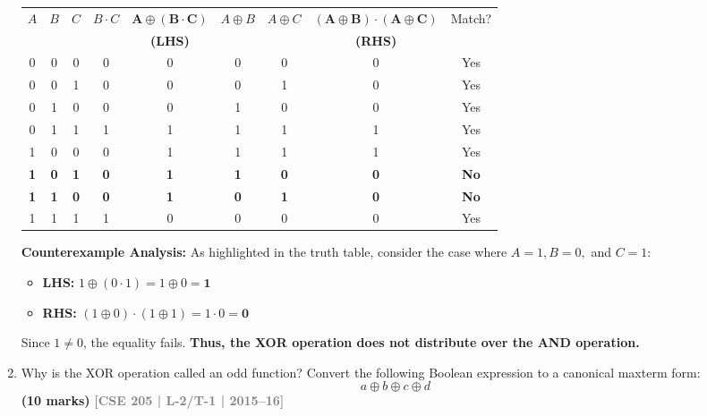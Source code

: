 \documentclass[12pt,a3paper]{article}
\newcommand{\yr}[1]{\hfill\textcolor{gray}{\small\textbf{[#1]}}}
\newcommand{\mk}[1]{\textcolor{orange!70!black}{\small\textbf{(#1 marks)}}}
\begin{document}
\begin{enumerate}
\begin{tcolorbox}[enhanced,breakable,ansbox,colback=cA!4,colframe=cA,boxrule=0.8pt,arc=5pt,title={\textbf{Answer}},fonttitle=\bfseries\color{white},colbacktitle=cA]
\begin{center}
\begin{tabular}{ccccccccc}
    \toprule
    $A$ & $B$ & $C$ & $B \cdot C$ & $\mathbf{A \oplus (B \cdot C)}$ & $A \oplus B$ & $A \oplus C$ & $\mathbf{(A \oplus B) \cdot (A \oplus C)}$ & Match? \\
    & & & & \textbf{(LHS)} & & & \textbf{(RHS)} & \\
    \midrule
    0 & 0 & 0 & 0 & 0 & 0 & 0 & 0 & Yes \\
    0 & 0 & 1 & 0 & 0 & 0 & 1 & 0 & Yes \\
    0 & 1 & 0 & 0 & 0 & 1 & 0 & 0 & Yes \\
    0 & 1 & 1 & 1 & 1 & 1 & 1 & 1 & Yes \\
    1 & 0 & 0 & 0 & 1 & 1 & 1 & 1 & Yes \\
    \textbf{\textcolor{cA}{1}} & \textbf{\textcolor{cA}{0}} & \textbf{\textcolor{cA}{1}} & \textbf{\textcolor{cA}{0}} & \textbf{\textcolor{cA}{1}} & \textbf{\textcolor{cA}{1}} & \textbf{\textcolor{cA}{0}} & \textbf{\textcolor{cA}{0}} & \textbf{\textcolor{cA}{No}} \\
    \textbf{\textcolor{cA}{1}} & \textbf{\textcolor{cA}{1}} & \textbf{\textcolor{cA}{0}} & \textbf{\textcolor{cA}{0}} & \textbf{\textcolor{cA}{1}} & \textbf{\textcolor{cA}{0}} & \textbf{\textcolor{cA}{1}} & \textbf{\textcolor{cA}{0}} & \textbf{\textcolor{cA}{No}} \\
    1 & 1 & 1 & 1 & 0 & 0 & 0 & 0 & Yes \\
    \bottomrule
\end{tabular}
\end{center}

\textbf{Counterexample Analysis:}
As highlighted in the truth table, consider the case where $A = 1, B = 0,$ and $C = 1$:
\begin{itemize}
    \item \textbf{LHS:} $1 \oplus (0 \cdot 1) = 1 \oplus 0 = \mathbf{1}$
    \item \textbf{RHS:} $(1 \oplus 0) \cdot (1 \oplus 1) = 1 \cdot 0 = \mathbf{0}$
\end{itemize}

Since $1 \neq 0$, the equality fails. \textbf{Thus, the XOR operation does not distribute over the AND operation.}

\end{tcolorbox}

\item Why is the XOR operation called an odd function? Convert the following Boolean expression to a canonical maxterm form:
\[ a \oplus b \oplus c \oplus d \]
\mk{10} \yr{CSE 205 | L-2/T-1 | 2015--16}


\end{enumerate}
\end{document}
